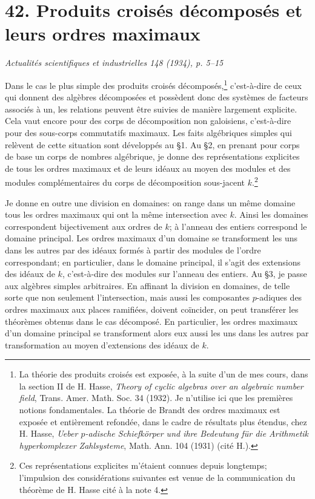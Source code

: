 \section*{42. Produits croisés décomposés et leurs ordres maximaux}

\begin{center}
\emph{Actualités scientifiques et industrielles 148 (1934), p. 5--15}
\end{center}

Dans le cas le plus simple des produits croisés décomposés,\footnote{La théorie des produits croisés est exposée, à la suite d'un de mes cours, dans la section II de H. Hasse, \emph{Theory of cyclic algebras over an algebraic number field}, Trans. Amer. Math. Soc. 34 (1932). Je n'utilise ici que les premières notions fondamentales. La théorie de Brandt des ordres maximaux est exposée et entièrement refondée, dans le cadre de résultats plus étendus, chez H. Hasse, \emph{Ueber \(p\)-adische Schiefkörper und ihre Bedeutung für die Arithmetik hyperkomplexer Zahlsysteme}, Math. Ann. 104 (1931) (cité H.).} c'est-à-dire de ceux qui donnent des algèbres décomposées et possèdent donc des systèmes de facteurs associés à un, les relations peuvent être suivies de manière largement explicite. Cela vaut encore pour des corps de décomposition non galoisiens, c'est-à-dire pour des sous-corps commutatifs maximaux. Les faits algébriques simples qui relèvent de cette situation sont développés au \S{}1. Au \S{}2, en prenant pour corps de base un corps de nombres algébrique, je donne des représentations explicites de tous les ordres maximaux et de leurs idéaux au moyen des modules et des modules complémentaires du corps de décomposition sous-jacent \(k\).\footnote{Ces représentations explicites m'étaient connues depuis longtemps; l'impulsion des considérations suivantes est venue de la communication du théorème de H. Hasse cité à la note 4.}

Je donne en outre une division en domaines: on range dans un même domaine tous les ordres maximaux qui ont la même intersection avec \(k\). Ainsi les domaines correspondent bijectivement aux ordres de \(k\); à l'anneau des entiers correspond le domaine principal. Les ordres maximaux d'un domaine se transforment les uns dans les autres par des idéaux formés à partir des modules de l'ordre correspondant; en particulier, dans le domaine principal, il s'agit des extensions des idéaux de \(k\), c'est-à-dire des modules sur l'anneau des entiers. Au \S{}3, je passe aux algèbres simples arbitraires. En affinant la division en domaines, de telle sorte que non seulement l'intersection, mais aussi les composantes \(p\)-adiques des ordres maximaux aux places ramifiées, doivent coïncider, on peut transférer les théorèmes obtenus dans le cas décomposé. En particulier, les ordres maximaux d'un domaine principal se transforment alors eux aussi les uns dans les autres par transformation au moyen d'extensions des idéaux de \(k\).

